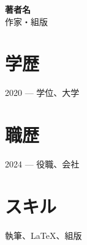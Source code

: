 \documentclass[11pt]{article}
\begin{document}
{\Large\bfseries 著者名}\\[4pt]
{\large 作家・組版}

\vspace{8pt}

\section*{学歴}
2020 — 学位、大学

\section*{職歴}
2024 — 役職、会社

\section*{スキル}
執筆、LaTeX、組版
\end{document}
